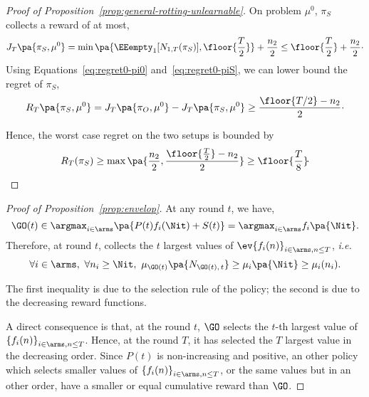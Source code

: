\begin{proof}[Proof of Proposition~\ref{prop:general-rotting-unlearnable}]
On problem $\mu^{0}$, $\pi_S$ collects a reward of at most,
\begin{equation}
\label{eq:regret0-piS}
    J_T\pa{\pi_S, \mu^0} = \min\pa{\EEempty_1[N_{1,T}(\pi_S)],\floor{\frac{T}{2}}} + \frac{n_2}{2} \leq \floor{\frac{T}{2}} + \frac{n_2}{2}\cdot
\end{equation}
Using Equations~\ref{eq:regret0-pi0} and~\ref{eq:regret0-piS}, we can lower bound the regret of $\pi_S$, 
\[ R_T\pa{\pi_S, \mu^0} = J_T\pa{\pi_O, \mu^0} - J_T\pa{\pi_S, \mu^0} \geq  \frac{\floor{T/2} - n_2}{2}\cdot \]

Hence, the worst case regret on the two setups is bounded by 
\begin{equation*}R_T(\pi_S) \geq \max\pa{\frac{n_2}{2}, \frac{\floor{\frac{T}{2}} - n_2}{2}} \geq \floor{\frac{T}{8}}\!\cdot
\end{equation*}
\end{proof}

\begin{proof}[Proof of Proposition~\ref{prop:envelop}]
At any round $t$, we have,
\[
\GO(t) \in \argmax_{i \in \arms} \pa{P(t)f_i(\Nit) + S(t)} = \argmax_{i \in \arms} f_i \pa{\Nit}.
\] 
Therefore, at round $t$, collects the $t$ largest values of $\ev{f_i(n)}_{i\in \arms, n\leq T}$, \textit{i.e.} 
\[
\forall i \in \arms, \ \forall n_i \geq \Nit, \ \mu_{\GO(t)}\pa{N_{\GO(t),\,t}} \geq\mu_{i}\pa{\Nit}  \geq \mu_i(n_i).
\]

The first inequality is due to the selection rule of the policy; the second is due to the decreasing reward functions. 

A direct consequence is that, at the round $t$, $\GO$ selects the $t$-th largest value of $\left\{f_i(n)\right\}_{i \in \arms, n \leq T}$. Hence, at the round $T$, it has selected the $T$ largest value in the decreasing order. Since $P(t)$ is non-increasing and positive, an other policy which selects smaller values of $\left\{f_i(n)\right\}_{i \in \arms, n \leq T}$, or the same values but in an other order, have a smaller or equal cumulative reward than $\GO$.
\end{proof}
